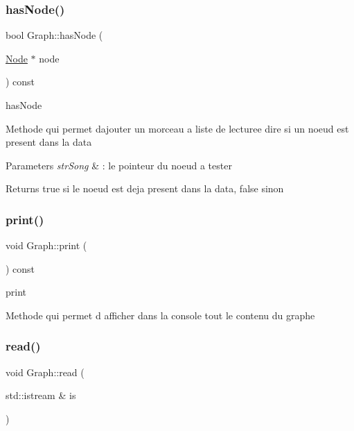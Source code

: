 \subsubsection{\texorpdfstring{has\+Node()}{hasNode()}}
{\footnotesize\ttfamily bool Graph\+::has\+Node (\begin{DoxyParamCaption}\item[{\mbox{\hyperlink{class_node}{Node}} $\ast$}]{node }\end{DoxyParamCaption}) const}



has\+Node 

Methode qui permet d\textquotesingle{}ajouter un morceau a liste de lecturee dire si un noeud est present dans la data


\begin{DoxyParams}{Parameters}
{\em str\+Song} & \+: le pointeur du noeud a tester \\
\hline
\end{DoxyParams}
\begin{DoxyReturn}{Returns}
true si le noeud est deja present dans la data, false sinon 
\end{DoxyReturn}
\mbox{\label{class_graph_aeeede3cb48be5d8cac08ea05ce54bd52}} 
\subsubsection{\texorpdfstring{print()}{print()}}
{\footnotesize\ttfamily void Graph\+::print (\begin{DoxyParamCaption}{ }\end{DoxyParamCaption}) const}



print 

Methode qui permet d afficher dans la console tout le contenu du graphe \mbox{\label{class_graph_a79b39cf3963c03095bb74017a23c145e}} 
\subsubsection{\texorpdfstring{read()}{read()}}
{\footnotesize\ttfamily void Graph\+::read (\begin{DoxyParamCaption}\item[{std\+::istream \&}]{is }\end{DoxyParamCaption})}



